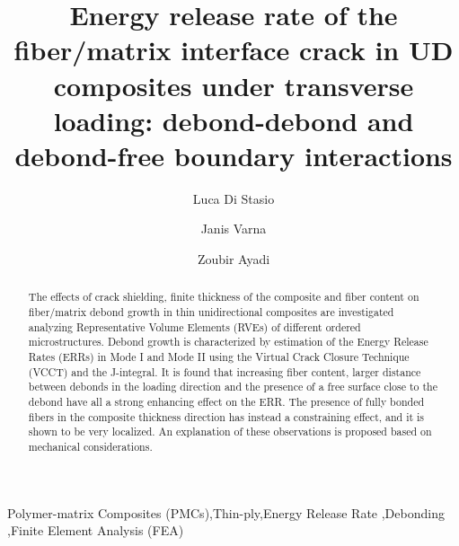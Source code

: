 \documentclass[review]{elsarticle}
\begin{document}
\begin{frontmatter}

\title{Energy release rate of the fiber/matrix interface crack in UD composites under transverse loading: debond-debond and debond-free boundary interactions}


\author[nancy,lulea]{Luca Di Stasio}
\author[lulea]{Janis Varna}
\author[nancy]{Zoubir Ayadi}


\address[nancy]{Universit\'e de Lorraine, EEIGM, IJL, 6 Rue Bastien Lepage, F-54010 Nancy, France}
\address[lulea]{Lule\aa\ University of Technology, University Campus, SE-97187 Lule\aa, Sweden}

\begin{abstract}
\noindent
The effects of crack shielding, finite thickness of the composite and fiber content on fiber/matrix debond growth in thin unidirectional composites are investigated analyzing  Representative Volume Elements (RVEs) of different ordered microstructures. Debond growth is characterized by estimation of the Energy Release Rates (ERRs) in Mode I and Mode II using the Virtual Crack Closure Technique (VCCT) and the J-integral. It is found that increasing fiber content, larger distance between debonds in the loading direction and the presence of a free surface close to the debond have all a strong enhancing effect on the ERR. The presence of fully bonded fibers in the composite thickness direction has instead a constraining effect, and it is shown to be very localized. An explanation of these observations is proposed based on mechanical considerations.
\end{abstract}

\begin{keyword}
Polymer-matrix Composites (PMCs)\sep Thin-ply\sep Energy Release Rate \sep Debonding \sep Finite Element Analysis (FEA)
\end{keyword}

\end{frontmatter}
\end{document}

